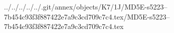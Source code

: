 ../../../../../.git/annex/objects/K7/1J/MD5E-s5223--7b454c93f3f887422e7a9c3cd709c7c4.tex/MD5E-s5223--7b454c93f3f887422e7a9c3cd709c7c4.tex